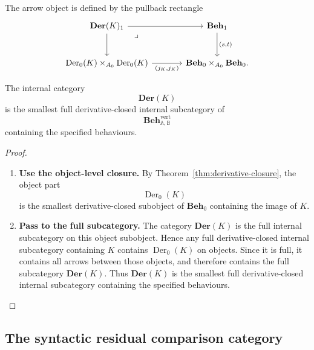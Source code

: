 The arrow object is defined by the pullback rectangle
\[
    \begin{tikzcd}[column sep=large, row sep=large]
            \mathbf{Der}(K)_1
                \arrow[r]
                \arrow[d]
                \arrow[dr, phantom, "\lrcorner", very near start]
        &
            \mathbf{Beh}_1
                \arrow[d, "{(s,t)}"]
        \\
            \operatorname{Der}_0(K)\times_{A_0}\operatorname{Der}_0(K)
                \arrow[r, "{(j_K,j_K)}"']
        &
            \mathbf{Beh}_0\times_{A_0}\mathbf{Beh}_0.
    \end{tikzcd}
\]

\begin{theorem}
\label{thm:generated-residual-behaviour-category}
    The internal category
    \[
        \mathbf{Der}(K)
    \]
    is the smallest full derivative-closed internal subcategory of
    \[
        \mathbf{Beh}^{\mathrm{vert}}_{\mathbb A,\mathbb B}
    \]
    containing the specified behaviours.
\end{theorem}
\begin{proof}
    \leavevmode
    \begin{enumerate}
        \item \textbf{Use the object-level closure.} By Theorem~\ref{thm:derivative-closure}, the object part
        \[
            \operatorname{Der}_0(K)
        \]
        is the smallest derivative-closed subobject of \(\mathbf{Beh}_0\) containing the image of \(K\).

        \item \textbf{Pass to the full subcategory.} The category \(\mathbf{Der}(K)\) is the full internal subcategory on this object subobject. Hence any full derivative-closed internal subcategory containing \(K\) contains \(\operatorname{Der}_0(K)\) on objects. Since it is full, it contains all arrows between those objects, and therefore contains the full subcategory \(\mathbf{Der}(K)\). Thus \(\mathbf{Der}(K)\) is the smallest full derivative-closed internal subcategory containing the specified behaviours.
    \end{enumerate}
\end{proof}

\subsection{The syntactic residual comparison category}
\label{subsec:syntactic-residual-comparison-category}

